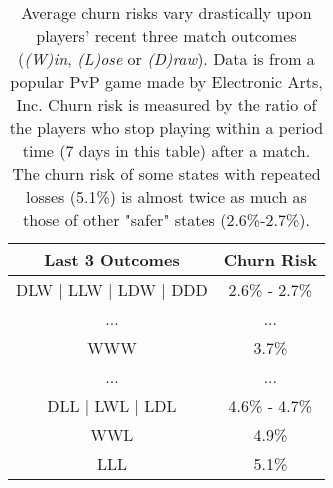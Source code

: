 \begin{table}
\centering
\caption{
Average churn risks vary drastically upon players' recent three match outcomes (\emph{(W)in}, \emph{(L)ose} or \emph{(D)raw}). Data is from a popular PvP game made by Electronic Arts, Inc. Churn risk is measured by the ratio of the players who stop playing within a period time (7 days in this table) after a match. The churn risk of some states with repeated losses (5.1\%) is almost twice as much as those of other "safer" states (2.6\%-2.7\%).
} \label{tab:churnrate}
\vspace{2mm}
\begin{tabular}{|c|c|}
\hline
Last 3 Outcomes & Churn Risk                      \\ \hline
DLW $|$ LLW $|$ LDW $|$ DDD      &  2.6\% - 2.7\%        \\
... & ...  \\
WWW   &  3.7\% \\
... & ... \\
DLL $|$ LWL $|$ LDL  &  4.6\% - 4.7\%  \\
WWL & 4.9\% \\
LLL & 5.1\% \\
\hline
\end{tabular}
\end{table}

